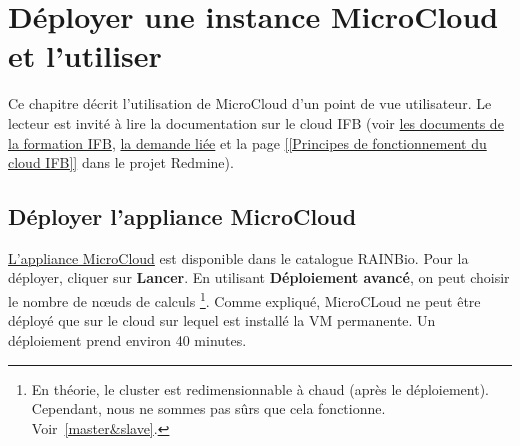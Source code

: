 \chapter{Déployer une instance MicroCloud et l'utiliser} \label{chap:deploiement}

Ce chapitre décrit l'utilisation de MicroCloud d'un point de vue utilisateur.
Le lecteur est invité à lire la documentation sur le cloud IFB
(voir \href{https://intranet.genoscope.cns.fr/agc/redmine/documents/86}{les documents de la formation IFB},
\href{https://intranet.genoscope.cns.fr/agc/redmine/issues/6010}{la demande liée}
et la page \href{https://intranet.genoscope.cns.fr/agc/redmine/projects/microcloud/wiki/Principes_de_fonctionnement_du_cloud_IFB}{[[Principes de fonctionnement du cloud IFB]]}
dans le projet Redmine).

\section{Déployer l'appliance MicroCloud}

\href{https://biosphere.france-bioinformatique.fr/catalogue/appliance/150/}{L'appliance MicroCloud} est disponible dans le catalogue RAINBio.
Pour la déployer, cliquer sur \textbf{Lancer}.
En utilisant \textbf{Déploiement avancé}, on peut choisir le nombre de nœuds de calculs
\footnote{En théorie, le cluster est redimensionnable à chaud (après le déploiement). Cependant, nous ne sommes pas sûrs que cela fonctionne. Voir~\autoref{master&slave}.}.
Comme expliqué, MicroCLoud ne peut être déployé que sur le cloud  sur lequel est installé la VM permanente.
Un déploiement prend environ 40 minutes.

